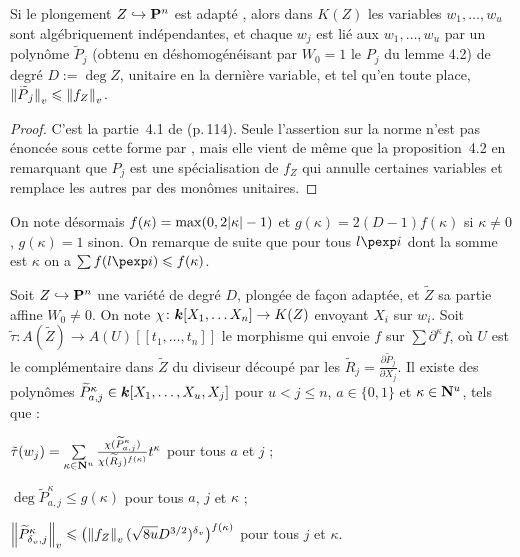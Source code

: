 \begin{fait}
  Si le plongement $Z \hookrightarrow \mathbf{P}^n$ est \og adapté \fg{}, alors
  dans $K(Z)$ les variables $w_1, \ldots, w_u$ sont algébriquement
  indépendantes, et chaque $w_j$ est lié aux $w_1, \ldots, w_u$ par un
  polynôme $\widetilde P _j$ (obtenu en déshomogénéisant par $W_0 = 1$ le
  $P_j$ du lemme 4.2) de degré $D := \deg Z$, unitaire en la dernière
  variable, et tel qu'en toute place, $\left\lVert\smash{\widetilde P}_j\right\rVert_{v} \leqslant
  \left\lVert f_Z\right\rVert_{v}$.
\end{fait}

\begin{proof}
  C'est la partie~4.1 de  (p.\,114). Seule l'assertion sur la norme
  n'est pas énoncée sous cette forme par , mais elle vient de même
  que la proposition~4.2 en remarquant que $P_j$ est une spécialisation de $f_Z$
  qui annulle certaines variables et remplace les autres par des monômes
  unitaires.
\end{proof}

On note désormais $f(\kappa) = \max(0, 2{\lvert\kappa\rvert} - 1)$ et $g(\kappa) =
2(D-1)f(\kappa)$ si $\kappa \neq 0$, $g(\kappa) = 1$ sinon. On remarque de
suite que pour tous $l\pexp i$ dont la somme est $\kappa$ on a $\sum f(l\pexp i)
\le f(\kappa)$.

\begin{lem}
  Soit $Z \hookrightarrow \mathbf{P}^n$ une variété de degré $D$, plongée de façon
  adaptée, et $\widetilde Z$ sa partie affine $W_0 \neq 0$. On note $\chi \colon
  \boldsymbol{k}[X_1, \ldots X_n] \to K(Z)$ envoyant $X_i$ sur $w_i$.  Soit $\tilde\tau :
  A(\widetilde Z) \to A(U)[[t_1, \ldots, t_n]]$ le morphisme qui envoie $f$ sur
  $\sum\partial^\kappa f$, où $U$ est le complémentaire dans $\widetilde Z$ du
  diviseur découpé par les $\widetilde R_j = \frac{\partial \widetilde P _j}
  {\partial X_j}$. Il existe des polynômes $\widetilde P_{a, j}^\kappa \in
  \boldsymbol{k}[X_1, \ldots, X_u, X_j]$ pour $u < j \le n$, $a \in \{0, 1\}$ et $\kappa
  \in \mathbf{N}^u$, tels que :
  \begin{enumthm}
    \item $\tilde\tau(w_j) = \sum\limits_{\kappa\in\mathbf{N}^u}
      \frac{\chi(\widetilde P_{a, j}^\kappa)}{\chi(\widetilde
      R_j)^{f(\kappa)}} t^\kappa$ pour tous $a$ et $j$ ;
    \item $\deg \widetilde P_{a, j}^\kappa \le g(\kappa)$ pour tous $a$, $j$ et
      $\kappa$ ;
    \item $\left\lVert\widetilde P_{{\delta\smash{_v}}, j}^\kappa\right\rVert_{v} \leqslant \bigl( \left\lVert f_Z\right\rVert_{v} (\sqrt{8u}
      D^{3/2})^{\delta\smash{_v}} \bigr)^{f(\kappa)}$ pour tous $j$ et $\kappa$.
  \end{enumthm}
\end{lem}

